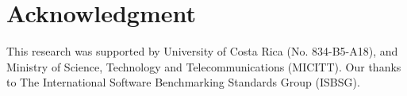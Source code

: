 \documentclass[conference]{IEEEtran}
\begin{document}

\section*{Acknowledgment}

This research was supported by University of Costa Rica (No. 834-B5-A18), and Ministry of Science, Technology and Telecommunications (MICITT). Our thanks to The International Software Benchmarking Standards Group (ISBSG).

\end{document}
